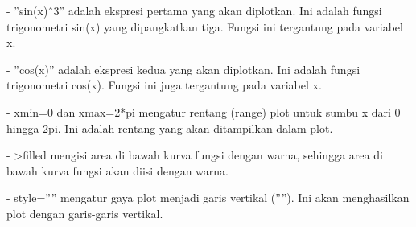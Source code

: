 \documentclass{article}
\begin{document}
\begin{eulernotebook}
\begin{eulercomment}
- ”sin(x)ˆ3” adalah ekspresi pertama yang akan diplotkan. Ini adalah
fungsi trigonometri sin(x) yang dipangkatkan tiga. Fungsi ini
tergantung pada variabel x.

- ”cos(x)” adalah ekspresi kedua yang akan diplotkan. Ini adalah
fungsi trigonometri cos(x). Fungsi ini juga tergantung pada variabel
x.

- xmin=0 dan xmax=2*pi mengatur rentang (range) plot untuk sumbu x
dari 0 hingga 2pi. Ini adalah rentang yang akan ditampilkan dalam
plot.

- \textgreater{}filled mengisi area di bawah kurva fungsi dengan warna, sehingga
area di bawah kurva fungsi akan diisi dengan warna.

- style=”\textbar{}” mengatur gaya plot menjadi garis vertikal (”\textbar{}”). Ini akan
menghasilkan plot dengan garis-garis vertikal.


\end{eulercomment}
\end{eulernotebook}
\end{document}
